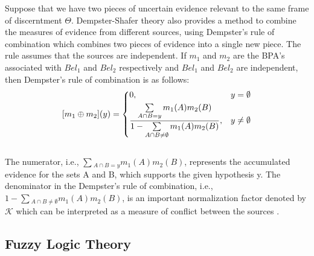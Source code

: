 \documentclass[11pt]{article}
\begin{document}
Suppose that we have two pieces of uncertain evidence relevant to the same frame of
discerntment $\Theta$. Dempster-Shafer theory also provides a method to combine
the measures of evidence from different sources, using Dempster's rule of
combination which combines two pieces of evidence into a single new piece. The
rule assumes that the sources are independent. If $m_1$ and $m_2$ are the BPA's
associated with $Bel_1$ and $Bel_2$ respectively and $Bel_1$ and $Bel_2$ are
independent, then Dempster's rule of combination is as follows:\\

\[
	[m_1 \oplus m_2](y) = 
    \begin{dcases}
      0, & y = \emptyset \\
      \frac{\sum\limits_{A \cap B = y}m_1(A)m_2(B)}{1-\sum\limits_{A
      \cap B \neq \emptyset}m_1(A)m_2(B)}, & y
      \neq
      \emptyset
	\end{dcases}
\]\\

\noindent The numerator, i.e., $\sum\limits{_{A \cap B =y}}m_1(A)m_2(B)$,
represents the accumulated evidence for the sets A and B, which supports the
given hypothesis y. The denominator in the Dempster's rule of combination, i.e.,
$1-\sum\limits{_{A \cap B \neq \emptyset}}m_1(A)m_2(B)$, is an important
normalization factor denoted by $\mathcal{K}$ which can be interpreted as a
measure of conflict between the sources
\cite{srivastava:evidential-reasoning-uncertainty}.

\subsection{Fuzzy Logic Theory}
\end{document}
